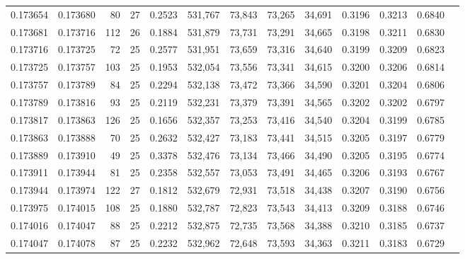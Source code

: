 \begin{tabular}{rrrrrrrrrrrrr}
0.173654 & 0.173680 &  80 &  27 &                                     0.2523 & 531,767 &  73,843 &  73,265 &  34,691 & 0.3196 & 0.3213 & 0.6840 \\
0.173681 & 0.173716 & 112 &  26 &                                     0.1884 & 531,879 &  73,731 &  73,291 &  34,665 & 0.3198 & 0.3211 & 0.6830 \\
0.173716 & 0.173725 &  72 &  25 &                                     0.2577 & 531,951 &  73,659 &  73,316 &  34,640 & 0.3199 & 0.3209 & 0.6823 \\
0.173725 & 0.173757 & 103 &  25 &                                     0.1953 & 532,054 &  73,556 &  73,341 &  34,615 & 0.3200 & 0.3206 & 0.6814 \\
0.173757 & 0.173789 &  84 &  25 &                                     0.2294 & 532,138 &  73,472 &  73,366 &  34,590 & 0.3201 & 0.3204 & 0.6806 \\
0.173789 & 0.173816 &  93 &  25 &                                     0.2119 & 532,231 &  73,379 &  73,391 &  34,565 & 0.3202 & 0.3202 & 0.6797 \\
0.173817 & 0.173863 & 126 &  25 &                                     0.1656 & 532,357 &  73,253 &  73,416 &  34,540 & 0.3204 & 0.3199 & 0.6785 \\
0.173863 & 0.173888 &  70 &  25 &                                     0.2632 & 532,427 &  73,183 &  73,441 &  34,515 & 0.3205 & 0.3197 & 0.6779 \\
0.173889 & 0.173910 &  49 &  25 &                                     0.3378 & 532,476 &  73,134 &  73,466 &  34,490 & 0.3205 & 0.3195 & 0.6774 \\
0.173911 & 0.173944 &  81 &  25 &                                     0.2358 & 532,557 &  73,053 &  73,491 &  34,465 & 0.3206 & 0.3193 & 0.6767 \\
0.173944 & 0.173974 & 122 &  27 &                                     0.1812 & 532,679 &  72,931 &  73,518 &  34,438 & 0.3207 & 0.3190 & 0.6756 \\
0.173975 & 0.174015 & 108 &  25 &                                     0.1880 & 532,787 &  72,823 &  73,543 &  34,413 & 0.3209 & 0.3188 & 0.6746 \\
0.174016 & 0.174047 &  88 &  25 &                                     0.2212 & 532,875 &  72,735 &  73,568 &  34,388 & 0.3210 & 0.3185 & 0.6737 \\
0.174047 & 0.174078 &  87 &  25 &                                     0.2232 & 532,962 &  72,648 &  73,593 &  34,363 & 0.3211 & 0.3183 & 0.6729 \\

\end{tabular}
